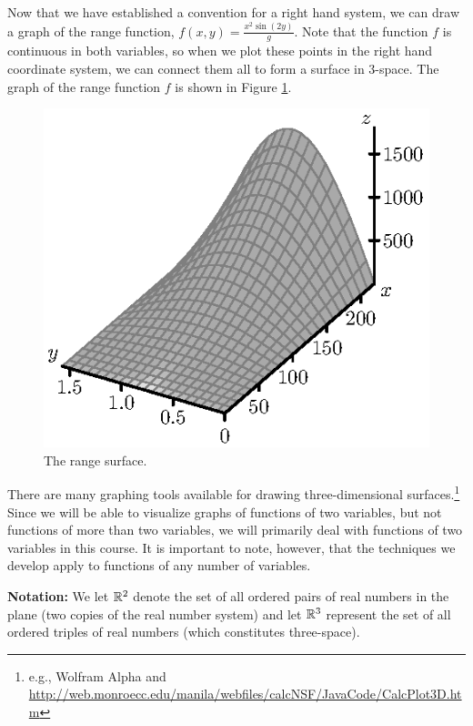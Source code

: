 Now that we have established a convention for a right hand system, we can draw a graph of the range function, $f(x,y) = \frac{x^2 \sin(2y)}{g}$. Note that the function $f$ is continuous in both variables, so when we plot these points in the right hand coordinate system, we can connect them all to form a surface in 3-space. The graph of the range function $f$ is shown in Figure \ref{F:9.1.range}.
\begin{figure}[ht]
\begin{center}
  \includegraphics{figures/fig_9_1_range.eps}
\caption{The range surface.}
\label{F:9.1.range}
\end{center}
\end{figure}

There are many graphing tools available for drawing three-dimensional
surfaces.\footnote{e.g., Wolfram Alpha and
  \url{http://web.monroecc.edu/manila/webfiles/calcNSF/JavaCode/CalcPlot3D.htm}}
Since we will be able to visualize graphs of functions of two
variables, but not functions of more than two variables, we will
primarily deal with functions of two variables in this course. It is
important to note, however, that the techniques we develop apply to
functions of any number of variables.

\vspace{10pt}

\noindent \textbf{Notation:} We let $\mathbb{R}^2$ denote the set of all
ordered pairs of real numbers in the plane (two copies of the real
number system) and let $\mathbb{R}^3$ represent the set of all ordered triples
of real numbers (which constitutes three-space).

